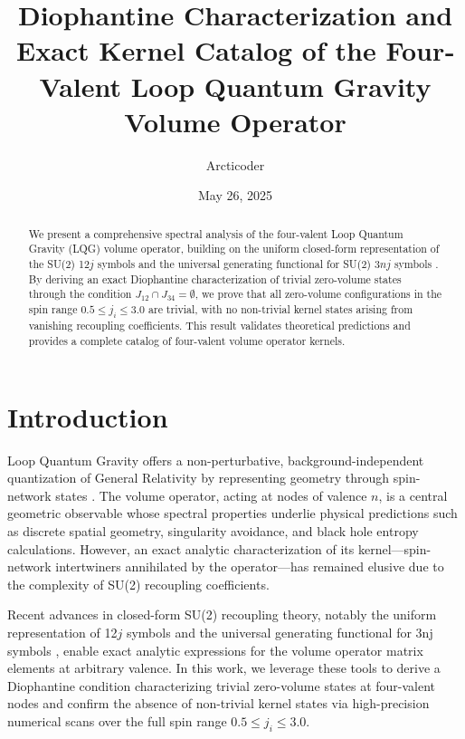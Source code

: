 \documentclass{article}
\begin{document}
\title{Diophantine Characterization and Exact Kernel Catalog of the Four‐Valent Loop Quantum Gravity Volume Operator}
\author{Arcticoder}
\date{May 26, 2025}
\maketitle

\begin{abstract}
We present a comprehensive spectral analysis of the four-valent Loop Quantum Gravity (LQG) volume operator, building on the uniform closed-form representation of the SU(2) 12$j$ symbols \cite{Arcticoder2025Uniform12j} and the universal generating functional for SU(2) $3nj$ symbols \cite{Arcticoder2025Generating}. By deriving an exact Diophantine characterization of trivial zero-volume states through the condition $J_{12}\cap J_{34}=\emptyset$, we prove that all zero-volume configurations in the spin range $0.5\le j_i\le3.0$ are trivial, with no non-trivial kernel states arising from vanishing recoupling coefficients. This result validates theoretical predictions and provides a complete catalog of four-valent volume operator kernels.
\end{abstract}

\section{Introduction}
Loop Quantum Gravity offers a non-perturbative, background-independent quantization of General Relativity by representing geometry through spin-network states \cite{AshtekarLewandowski2004}. The volume operator, acting at nodes of valence $n$, is a central geometric observable whose spectral properties underlie physical predictions such as discrete spatial geometry, singularity avoidance, and black hole entropy calculations. However, an exact analytic characterization of its kernel—spin-network intertwiners annihilated by the operator—has remained elusive due to the complexity of SU(2) recoupling coefficients.

Recent advances in closed-form SU(2) recoupling theory, notably the uniform representation of 12$j$ symbols \cite{Arcticoder2025Uniform12j} and the universal generating functional for 3nj symbols \cite{Arcticoder2025Generating}, enable exact analytic expressions for the volume operator matrix elements at arbitrary valence. In this work, we leverage these tools to derive a Diophantine condition characterizing trivial zero-volume states at four-valent nodes and confirm the absence of non-trivial kernel states via high-precision numerical scans over the full spin range $0.5\le j_i\le3.0$.
\end{document}
